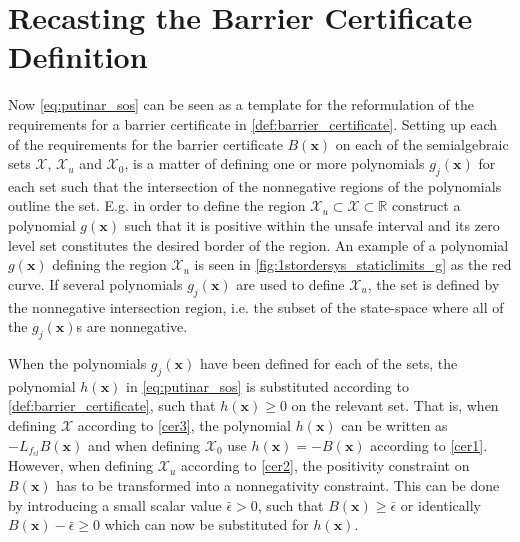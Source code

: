 \section{Recasting the Barrier Certificate Definition}
\vspace{-2mm}
Now \autoref{eq:putinar_sos} can be seen as a template for the reformulation of the requirements for a barrier certificate in \autoref{def:barrier_certificate}.
Setting up each of the requirements for the barrier certificate $B(\mathbf{x})$ on each of the  semialgebraic sets $\mathcal{X}$, $\mathcal{X}_u$ and $\mathcal{X}_0$, is a matter of defining one or more polynomials $g_j(\mathbf{x})$ for each set such that the intersection of the nonnegative regions of the polynomials outline the set.
E.g. in order to define the region $\mathcal{X}_u\subset\mathcal{X}\subset\mathbb{R}$ construct a polynomial $g(\mathbf{x})$ such that it is positive within the unsafe interval and its zero level set constitutes the desired border of the region. An example of a polynomial $g(\mathbf{x})$ defining the region $\mathcal{X}_u$ is seen in \autoref{fig:1stordersys_staticlimits_g} as the red curve. If several polynomials $g_j(\mathbf{x})$ are used to define $\mathcal{X}_u$, the set is defined by the nonnegative intersection region, i.e. the subset of the state-space where all of the $g_j(\mathbf{x})$s are nonnegative.

When the polynomials $g_j(\mathbf{x})$ have been defined for each of the sets, the polynomial $h(\mathbf{x})$ in \autoref{eq:putinar_sos} is substituted according to \autoref{def:barrier_certificate}, such that $h(\mathbf{x})\geq 0$ on the relevant set. That is, when defining $\mathcal{X}$ according to \autoref{cer3}, the polynomial $h(\mathbf{x})$ can be written as $-L_{f_{cl}}B(\mathbf{x})$ and when defining $\mathcal{X}_0$ use $h(\mathbf{x})=-B(\mathbf{x})$ according to \autoref{cer1}. However, when defining $\mathcal{X}_u$ according to \autoref{cer2}, the positivity constraint on $B(\mathbf{x})$ has to be transformed into a nonnegativity constraint. This can be done by introducing a small scalar value $\bar{\epsilon}>0$, such that $B(\mathbf{x})\geq \bar{\epsilon} $ or identically $B(\mathbf{x})-\bar{\epsilon}\geq 0$ which can now be substituted for $h(\mathbf{x})$.

